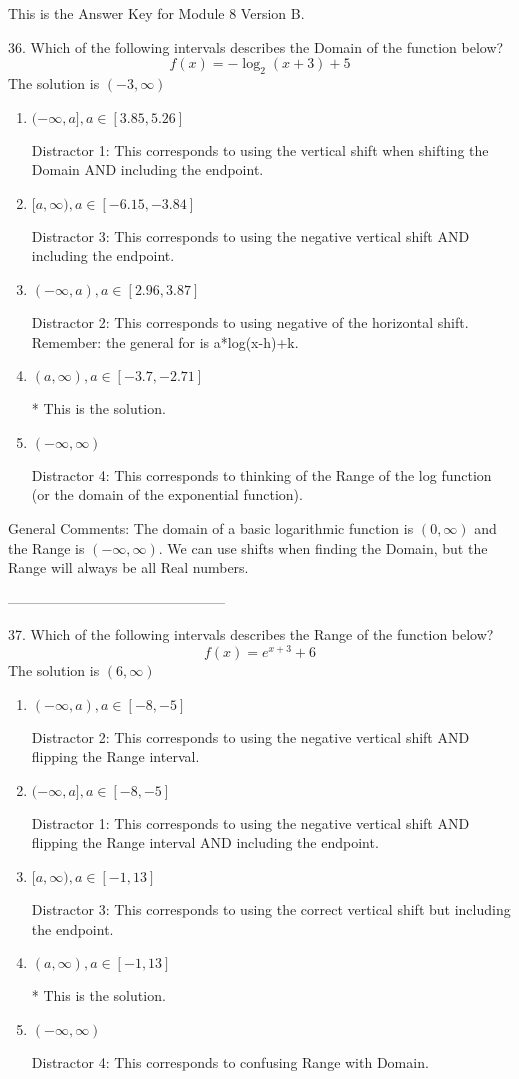 \documentclass{article}[10pt]
\begin{document}
This is the Answer Key for Module 8 Version B.

36. Which of the following intervals describes the Domain of the function below?
$$ f(x) = -\log_2{(x+3)}+5 $$ 
The solution is $ (-3, \infty) $ 

\begin{enumerate}[label=\Alph*.] 
\item $ (-\infty, a], a \in [3.85, 5.26] $ 

  Distractor 1: This corresponds to using the vertical shift when shifting the Domain AND including the endpoint. 
\item $ [a, \infty), a \in [-6.15, -3.84] $ 

  Distractor 3: This corresponds to using the negative vertical shift AND including the endpoint. 
\item $ (-\infty, a), a \in [2.96, 3.87] $ 

  Distractor 2: This corresponds to using negative of the horizontal shift. Remember: the general for is a*log(x-h)+k. 
\item $ (a, \infty), a \in [-3.7, -2.71] $ 

 * This is the solution. 
\item $ (-\infty, \infty) $ 

 Distractor 4: This corresponds to thinking of the Range of the log function (or the domain of the exponential function). 
\end{enumerate} 
 
General Comments: The domain of a basic logarithmic function is $(0, \infty)$ and the Range is $(-\infty, \infty)$. We can use shifts when finding the Domain, but the Range will always be all Real numbers.

-----------------------------------------------

37. Which of the following intervals describes the Range of the function below?
$$ f(x) = e^{x+3}+6 $$ 
The solution is $ (6, \infty) $ 

\begin{enumerate}[label=\Alph*.] 
\item $ (-\infty, a), a \in [-8, -5] $ 

  Distractor 2: This corresponds to using the negative vertical shift AND flipping the Range interval. 
\item $ (-\infty, a], a \in [-8, -5] $ 

  Distractor 1: This corresponds to using the negative vertical shift AND flipping the Range interval AND including the endpoint. 
\item $ [a, \infty), a \in [-1, 13] $ 

  Distractor 3: This corresponds to using the correct vertical shift but including the endpoint. 
\item $ (a, \infty), a \in [-1, 13] $ 

 * This is the solution. 
\item $ (-\infty, \infty) $ 

 Distractor 4: This corresponds to confusing Range with Domain. 
\end{enumerate} 
 
\end{document}
